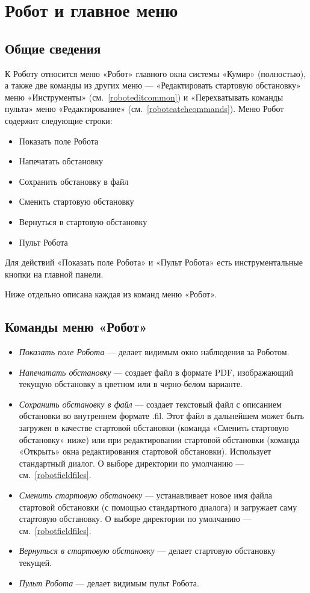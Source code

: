 \documentclass[12pt,a4paper]{article}
\begin{document}
\section{Робот и главное меню}

\subsection{Общие сведения}

К Роботу относится меню «Робот» главного окна системы «Кумир» (полностью), а также две команды из других меню --- «Редактировать стартовую обстановку» меню «Инструменты» (см.~\ref{roboteditcommon}) и «Перехватывать команды пульта» меню «Редактирование» (см.~\ref{robotcatchcommands}). Меню Робот содержит следующие строки:
\begin{itemize}
\item Показать поле Робота
\item Напечатать обстановку
\item Сохранить обстановку в файл
\item Сменить стартовую обстановку
\item Вернуться в стартовую обстановку
\item Пульт Робота
\end{itemize}

Для действий «Показать поле Робота» и «Пульт Робота» есть инструментальные кнопки на главной панели.

Ниже отдельно описана каждая из команд меню «Робот».

\subsection[Команды меню ''Робот'']{Команды меню «Робот»}

\begin{itemize}
\item \emph{Показать поле Робота} --- делает видимым окно наблюдения за Роботом.
\item \emph{Напечатать обстановку} --- создает файл в формате PDF, изображающий текущую обстановку в цветном или в черно-белом варианте.\label{robotprinttopdf}
\item \emph{Сохранить обстановку в файл} --- создает текстовый файл с описанием обстановки во внутреннем формате .fil. Этот файл в дальнейшем может быть загружен в качестве стартовой обстановки (команда «Сменить стартовую обстановку» ниже) или при редактировании стартовой обстановки (команда «Открыть» окна редактирования стартовой обстановки). Использует стандартный диалог. О выборе директории по умолчанию --- см.~\ref{robotfieldfiles}.
\item \emph{Сменить стартовую обстановку} --- устанавливает новое имя файла стартовой обстановки (с помощью стандартного диалога) и загружает саму стартовую обстановку. О выборе директории по умолчанию --- см.~\ref{robotfieldfiles}.
\item \emph{Вернуться в стартовую обстановку} --- делает стартовую обстановку текущей.
\item \emph{Пульт Робота} --- делает видимым пульт Робота.
\end{itemize}
\end{document}

